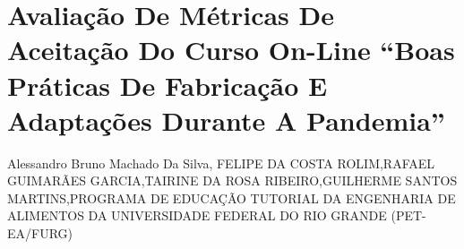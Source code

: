 


\section*{Avaliação De Métricas De Aceitação Do Curso On-Line “Boas Práticas De Fabricação E Adaptações Durante A Pandemia”}

Alessandro Bruno Machado Da Silva, FELIPE DA COSTA ROLIM,RAFAEL GUIMARÃES GARCIA,TAIRINE DA ROSA RIBEIRO,GUILHERME SANTOS MARTINS,PROGRAMA DE EDUCAÇÃO TUTORIAL DA ENGENHARIA DE ALIMENTOS DA UNIVERSIDADE FEDERAL DO RIO GRANDE (PET-EA/FURG)

